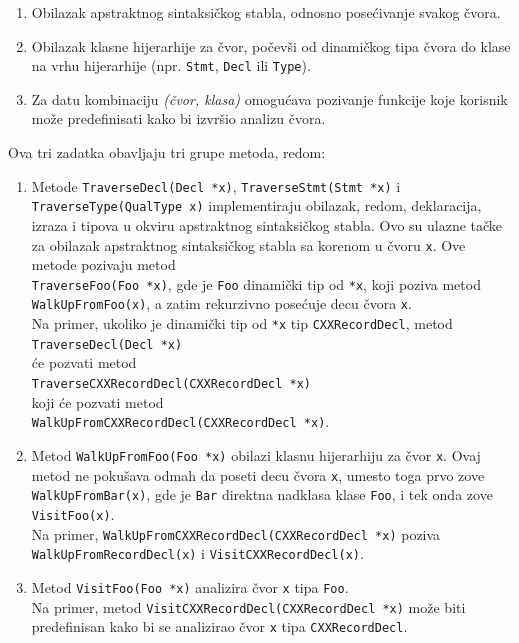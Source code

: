 \documentclass[12pt,oneside]{memoir}
\begin{document}
\begin{enumerate}
\item Obilazak apstraktnog sintaksi\v{c}kog stabla, odnosno pose\'{c}ivanje svakog \v{c}vora.
\item Obilazak klasne hijerarhije za \v{c}vor, počevši od dinamičkog tipa čvora do klase na vrhu hijerarhije (npr. \texttt{Stmt}, \texttt{Decl} ili \texttt{Type}).
\item Za datu kombinaciju \textit{(čvor, klasa)} omogu\'{c}ava pozivanje funkcije koje korisnik može predefinisati kako bi izvr\v{s}io analizu čvora.
\end{enumerate}
Ova tri zadatka obavljaju tri grupe metoda, redom:
\begin{enumerate}
  \item Metode \texttt{TraverseDecl(Decl *x)}, \texttt{TraverseStmt(Stmt *x)} i \texttt{TraverseType\-(QualType x)} implementiraju obilazak, redom, deklaracija, izraza i tipova u okviru apstraktnog sintaksi\v{c}kog stabla. Ovo su ulazne tačke za obilazak apstraktnog sintaksi\v{c}kog stabla sa korenom u čvoru \texttt{x}. Ove metode pozivaju metod \\ \texttt{TraverseFoo(Foo *x)}, gde je \texttt{Foo} dinamički tip od \texttt{*x}, koji poziva metod \\ \texttt{WalkUpFromFoo(x)}, a zatim rekurzivno posećuje decu čvora \texttt{x}. \\
  Na primer, ukoliko je dinami\v{c}ki tip od \texttt{*x} tip \texttt{CXXRecordDecl}, metod \\ \texttt{TraverseDecl(Decl *x)} \\ \'{c}e pozvati metod \\ \texttt{TraverseCXXRecordDecl(CXXRecordDecl *x)} \\ koji \'{c}e pozvati metod \\ \texttt{WalkUpFromCXXRecordDecl(CXXRecordDecl *x)}. 

\item Metod \texttt{WalkUpFromFoo(Foo *x)} obilazi klasnu hijerarhiju za \v{c}vor \texttt{x}. Ovaj metod ne pokušava odmah da poseti decu čvora \texttt{x}, umesto toga prvo zove \texttt{WalkUpFromBar(x)}, gde je \texttt{Bar} direktna nadklasa klase \texttt{Foo}, i tek onda zove \texttt{VisitFoo(x)}. \\
Na primer, \texttt{WalkUpFromCXXRecordDecl(CXXRecordDecl *x)} poziva \\ \texttt{WalkUpFromRecordDecl(x)} i \texttt{VisitCXXRecordDecl(x)}.
\item Metod \texttt{VisitFoo(Foo *x)} analizira \v{c}vor \texttt{x} tipa \texttt{Foo}. \\Na primer, metod \texttt{VisitCXXRecordDecl(CXXRecordDecl *x)} mo\v{z}e biti predefinisan kako bi se analizirao \v{c}vor \texttt{x} tipa \texttt{CXXRecordDecl}.
\end{enumerate}
\end{document}
